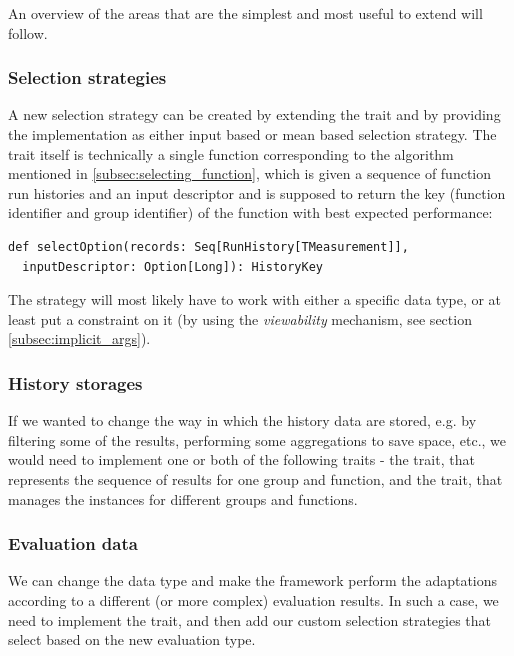An overview of the areas that are the simplest and most useful to extend will follow.

\subsubsection{Selection strategies}

A new selection strategy can be created by extending the  trait and by providing the implementation as either input based or mean based selection strategy. The trait itself is technically a single function corresponding to the algorithm mentioned in \ref{subsec:selecting_function}, which is given a sequence of function run histories and an input descriptor and is supposed to return the key (function identifier and group identifier) of the function with best expected performance:

\lstset{style=Scala}
\begin{lstlisting}
def selectOption(records: Seq[RunHistory[TMeasurement]], 
  inputDescriptor: Option[Long]): HistoryKey
\end{lstlisting}

The strategy will most likely have to work with either a specific  data type, or at least put a constraint on it (by using the \textit{viewability} mechanism, see section \ref{subsec:implicit_args}).

\subsubsection{History storages}

If we wanted to change the way in which the history data are stored, e.g. by filtering some of the results, performing some aggregations to save space, etc., we would need to implement one or both of the following traits - the  trait, that represents the sequence of results for one group and function, and the  trait, that manages the  instances for different groups and functions.

\subsubsection{Evaluation data}

We can change the  data type and make the framework perform the adaptations according to a different (or more complex) evaluation results. In such a case, we need to implement the  trait, and then add our custom selection strategies that select based on the new evaluation type.

